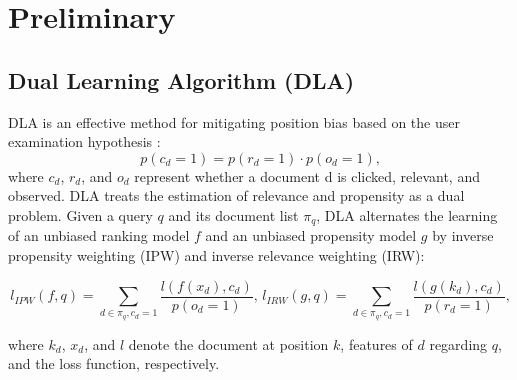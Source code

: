 \section{Preliminary}
\subsection{Dual Learning Algorithm (DLA)}
DLA \cite{ai2018unbiased} is an effective method for mitigating position bias based on the user examination hypothesis \cite{richardson2007predicting}: 
\begin{equation}
p(c_d=1)=p(r_d=1)\cdot p(o_d=1)\text{,}
\end{equation}
where $c_d$, $r_d$, and $o_d$ represent whether a document d is clicked, relevant, and observed.
DLA treats the estimation of relevance and propensity as a dual problem. Given a query $q$ and its document list $\pi_q$, DLA alternates the learning of an unbiased ranking model $f$ and an unbiased propensity model $g$ by inverse propensity weighting (IPW) and inverse relevance weighting (IRW):
\begin{small}
\begin{equation}
l_{IPW}(f,q)=\!\!\!\!\!\!\!\!\sum_{d\in \pi_q, c_d=1}\!\!\!\!\frac{l(f(x_d),c_d)}{p(o_d=1)}\text{, }l_{IRW}(g,q)=\!\!\!\!\!\!\!\!\sum_{d\in \pi_q, c_d=1}\!\!\!\!\frac{l(g(k_d),c_d)}{p(r_d=1)}\text{,}
\end{equation}\end{small}
where $k_d$, $x_d$, and $l$ denote the document at position $k$, features of $d$ regarding $q$, and the loss function, respectively.
